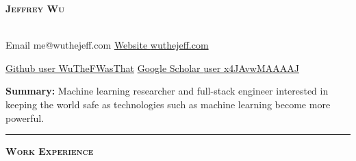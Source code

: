 \documentclass[11 pt]{article}
\begin{document}
\begin{center}
\begin{LARGE}\textsc{\textbf{Jeffrey Wu}}\end{LARGE} \\
Email {\tiny me@wuthejeff.com} \hfill
\href{http://wuthejeff.com}{Website {\tiny wuthejeff.com}}


\href{https://github.com/WuTheFWasThat}{Github {\tiny user WuTheFWasThat}}  \hfill \href{https://scholar.google.com/citations?user=x4JAvwMAAAAJ}{Google Scholar {\tiny user x4JAvwMAAAAJ}}\\
\end{center}

\noindent \textbf{Summary:}
Machine learning researcher and full-stack engineer
interested in keeping the world safe as technologies such as machine learning become more powerful. \\





\hrule


\begin{center}\begin{Large}\textsc{\textbf{Work Experience}\\}\end{Large}\end{center}
\end{document}
